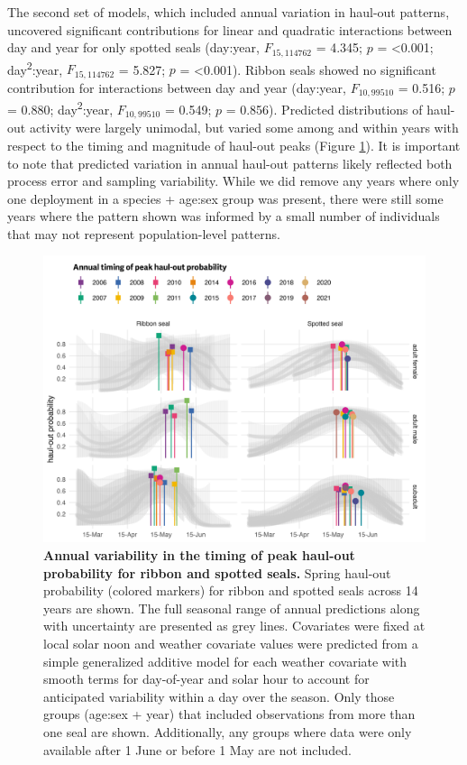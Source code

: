 \documentclass[fleqn,10pt,lineno]{wlpeerj} %
\begin{document}
The second set of models, which included annual variation in haul-out
patterns, uncovered significant contributions for linear and quadratic
interactions between day and year for only spotted seals (day:year,
\(F_{15,114762}\)
= 4.345; \(p\) =
\textless0.001; day\textsuperscript{2}:year,
\(F_{15,114762}\)
= 5.827; \(p\) =
\textless0.001). Ribbon seals showed no significant
contribution for interactions between day and year (day:year,
\(F_{10,99510}\)
= 0.516; \(p\) =
0.880; day\textsuperscript{2}:year,
\(F_{10,99510}\)
= 0.549; \(p\) =
0.856). Predicted distributions of
haul-out activity were largely unimodal, but varied some among and
within years with respect to the timing and magnitude of haul-out peaks
(Figure \ref{fig:annualHO}). It is important to note that predicted
variation in annual haul-out patterns likely reflected both process error
and sampling variability. While we did remove any years where only one
deployment in a species + age:sex group was present, there were still
some years where the pattern shown was informed by a small number of
individuals that may not represent population-level patterns.



\begin{figure}
\includegraphics[width=1\linewidth]{../figures/annualHO-1} \caption{\textbf{Annual variability in the timing of peak haul-out probability for ribbon and spotted seals.} \linebreak Spring haul-out probability (colored markers) for ribbon and spotted seals across 14 years are shown. The full seasonal range of annual predictions along with uncertainty are presented as grey lines. Covariates were fixed at local solar noon and weather covariate values were predicted from a simple generalized additive model for each weather covariate with smooth terms for day-of-year and solar hour to account for anticipated variability within a day over the season. Only those groups (age:sex + year) that included observations from more than one seal are shown. Additionally, any groups where data were only available after 1 June or before 1 May are not included.}\label{fig:annualHO}
\end{figure}
\end{document}
